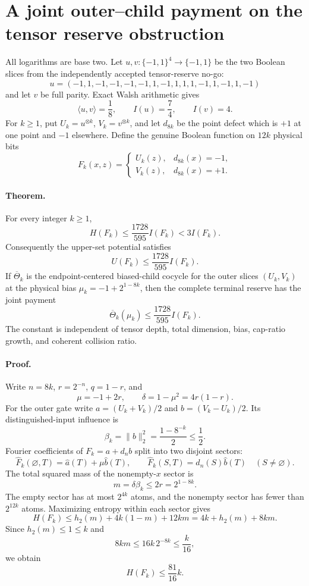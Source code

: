 \section*{A joint outer--child payment on the tensor reserve obstruction}

All logarithms are base two.  Let $u,v:\{-1,1\}^4\to\{-1,1\}$ be the
two Boolean slices from the independently accepted tensor-reserve no-go:
\[
u=(-1,1,-1,-1,-1,-1,1,-1,1,1,1,-1,1,-1,1,-1)
\]
and let $v$ be full parity.  Exact Walsh arithmetic gives
\[
 \langle u,v\rangle=\frac18,\qquad I(u)=\frac74,
 \qquad I(v)=4.
\]
For $k\ge1$, put $U_k=u^{\otimes k}$, $V_k=v^{\otimes k}$, and let
$d_{8k}$ be the point defect which is $+1$ at one point and $-1$
elsewhere.  Define the genuine Boolean function on $12k$ physical bits
\[
 F_k(x,z)=
 \begin{cases}
 U_k(z),&d_{8k}(x)=-1,\\
 V_k(z),&d_{8k}(x)=+1.
 \end{cases}
\]

\paragraph{Theorem.}
For every integer $k\ge1$,
\[
 H(F_k)\le \frac{1728}{595}I(F_k)<3I(F_k).
\]
Consequently the upper-set potential satisfies
\[
 U(F_k)\le \frac{1728}{595}I(F_k).
\]
If $\overline\Theta_k$ is the endpoint-centered biased-child cocycle for
the outer slices $(U_k,V_k)$ at the physical bias
$\mu_k=-1+2^{1-8k}$, then the complete terminal reserve has the joint
payment
\[
 \overline\Theta_k(\mu_k)
 \le \frac{1728}{595}I(F_k).
\]
The constant is independent of tensor depth, total dimension, bias,
cap-ratio growth, and coherent collision ratio.

\paragraph{Proof.}
Write $n=8k$, $r=2^{-n}$, $q=1-r$, and
\[
 \mu=-1+2r,\qquad \delta=1-\mu^2=4r(1-r).
\]
For the outer gate write $a=(U_k+V_k)/2$ and
$b=(V_k-U_k)/2$.  Its distinguished-input influence is
\[
 \beta_k=\|b\|_2^2=\frac{1-8^{-k}}2\le\frac12.
\]
Fourier coefficients of $F_k=a+d_n b$ split into two disjoint sectors:
\[
 \widehat F_k(\varnothing,T)=\widehat a(T)+\mu\widehat b(T),
 \qquad
 \widehat F_k(S,T)=\widehat d_n(S)\widehat b(T)\quad(S\ne\varnothing).
\]
The total squared mass of the nonempty-$x$ sector is
\[
 m=\delta\beta_k\le2r=2^{1-8k}.
\]
The empty sector has at most $2^{4k}$ atoms, and the nonempty sector has
fewer than $2^{12k}$ atoms.  Maximizing entropy within each sector gives
\[
 H(F_k)\le h_2(m)+4k(1-m)+12km
          =4k+h_2(m)+8km.
\]
Since $h_2(m)\le1\le k$ and
\[
8km\le16k\,2^{-8k}\le\frac{k}{16},
\]
we obtain
\[
 H(F_k)\le\frac{81}{16}k.                         \tag{1}
\]

